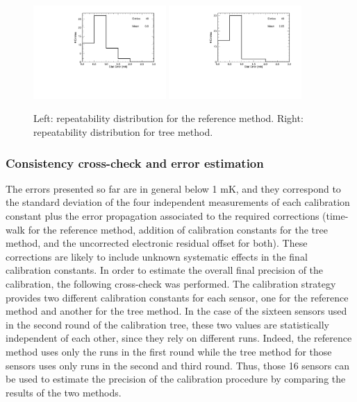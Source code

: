 \begin{figure}[htbp]
\centering
{\includegraphics[width=0.45\textwidth]{images/figure_13_a.pdf}}
{\includegraphics[width=0.45\textwidth]{images/figure_13_b.pdf}}
\caption{Left: repeatability distribution for the reference method. Right: repeatability distribution for tree method.}
\label{fig:offsets_tree_2}
\end{figure}

\subsubsection{Consistency cross-check and error estimation} 
\label{sec:crossCheck}
\noindent The errors presented so far are in general below 1 mK, and they correspond to the standard deviation of the four independent measurements of each calibration constant plus the error propagation associated to the required corrections (time-walk for the reference method, addition of calibration constants for the tree method, and the uncorrected electronic residual offset for both). These corrections are likely to include unknown systematic effects in the final calibration constants. In order to estimate the overall final precision of the calibration, the following cross-check was performed. The calibration strategy provides two different calibration constants for each sensor, one for the reference method and another for the tree method. In the case of the sixteen sensors used in the second round of the calibration tree, these two values are statistically independent of each other, since they rely on  different runs. Indeed, the reference method uses only the runs in the first round while the tree method for those sensors uses only runs in the second and third round. Thus, those 16 sensors can be used to estimate the precision of the calibration procedure by comparing the results of the two methods.


